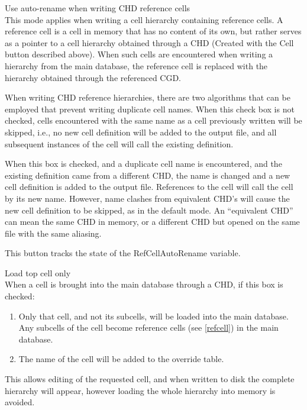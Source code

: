 \begin{description}
\item{\cb Use auto-rename when writing CHD reference cells}\\
This mode applies when writing a cell hierarchy containing reference
cells.  A reference cell is a cell in memory that has no content of
its own, but rather serves as a pointer to a cell hierarchy obtained
through a CHD (Created with the {\cb Cell} button described above). 
When such cells are encountered when writing a hierarchy from the main
database, the reference cell is replaced with the hierarchy obtained
through the referenced CGD.

When writing CHD reference hierarchies, there are two algorithms that
can be employed that prevent writing duplicate cell names.  When this
check box is not checked, cells encountered with the same name as a
cell previously written will be skipped, i.e., no new cell definition
will be added to the output file, and all subsequent instances of the
cell will call the existing definition.

When this box is checked, and a duplicate cell name is encountered,
and the existing definition came from a different CHD, the name is
changed and a new cell definition is added to the output file. 
References to the cell will call the cell by its new name.  However,
name clashes from equivalent CHD's will cause the new cell definition
to be skipped, as in the default mode.  An ``equivalent CHD'' can mean
the same CHD in memory, or a different CHD but opened on the same file
with the same aliasing.

This button tracks the state of the {\et RefCellAutoRename} variable.

\item{\cb Load top cell only}\\
When a cell is brought into the main database through a CHD, if
this box is checked:
\begin{enumerate}
\item{Only that cell, and not its subcells, will be loaded into the
main database.  Any subcells of the cell become reference cells (see
\ref{refcell}) in the main database.}
\item{The name of the cell will be added to the
override table.}
\end{enumerate}

This allows editing of the requested cell, and when written to disk
the complete hierarchy will appear, however loading the whole
hierarchy into memory is avoided.


\end{description}
